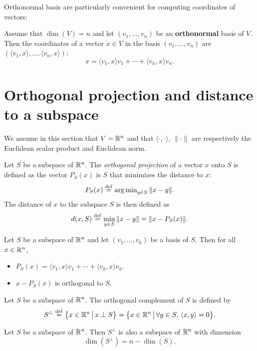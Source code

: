 \documentclass[11pt,nocut]{article}
\begin{document}
Orthonormal basis are particularly convenient for computing coordinates of vectors:

\begin{proposition}
	Assume that $\dim(V)=n$ and let $(v_1, \dots, v_n)$ be an \textbf{orthonormal} basis of $V$. Then the coordinates of a vector $x \in V$ in the basis $(v_1, \dots, v_n)$ are $(\langle v_1, x\rangle, \dots, \langle v_n,x \rangle)$:
	$$
	x = \langle v_1, x \rangle v_1 + \cdots + \langle v_n, x \rangle v_n.
	$$
\end{proposition}

\section{Orthogonal projection and distance to a subspace}

We assume in this section that $V = \mathbb{R}^n$ and that $\langle \cdot, \cdot \rangle$, $\| \cdot \|$ are respectively the Euclidean scalar product and Euclidean norm.

\begin{definition}
	Let $S$ be a subspace of $\mathbb{R}^n$. The \emph{orthogonal projection} of a vector $x$ onto $S$ is defined as the vector $P_S(x)$ is $S$ that minimizes the distance to $x$:
	$$
	P_S(x) \overset{\rm def}{=} \operatorname{arg\,min}_{y \in S} \|x - y\|.
	$$
	The distance of $x$ to the subspace $S$ is then defined as
	$$
	d(x,S) \overset{\rm def}{=} \min_{y \in S} \| x - y \| = \|x - P_S(x)\|.
	$$
\end{definition}

\begin{proposition}\label{prop:ortho}
	Let $S$ be a subspace of $\mathbb{R}^n$ and let $(v_1, \dots, v_k)$ be a basis of $S$. Then for all $x \in \mathbb{R}^n$,
	\begin{itemize}
		\item $P_S(x) = \langle v_1, x \rangle v_1 + \cdots + \langle v_k, x \rangle v_k$.
		\item $x - P_S(x)$ is orthogonal to $S$.
	\end{itemize}
\end{proposition}


\begin{definition}
	Let $S$ be a subspace of $\mathbb{R}^n$. The orthogonal complement of $S$ is defined by
	$$
	S^{\perp} \overset{\rm def}{=} 
	\big\{ x \in \mathbb{R}^n \, \big| \, x \perp S \big\} = 
	\big\{ x \in \mathbb{R}^n \, \big| \, \forall y \in S, \, \langle x,y \rangle = 0 \big\}.
	$$
\end{definition}

\begin{proposition}
	Let $S$ be a subspace of $\mathbb{R}^n$. Then $S^{\perp}$ is also a subspace of $\mathbb{R}^n$ with dimension
	$$
	\dim(S^{\perp}) = n - \dim(S).
	$$
\end{proposition}

\vspace{1cm}
\centerline{}

%
%
\end{document}
